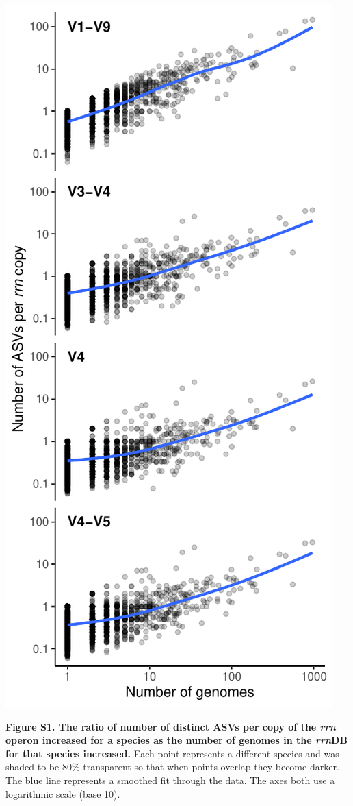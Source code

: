 \documentclass[
]{article}
\begin{document}
\newpage

\includegraphics{../figures/esv_rate.pdf}

\textbf{Figure S1. The ratio of number of distinct ASVs per copy of the
\emph{rrn} operon increased for a species as the number of genomes in
the \emph{rrn}DB for that species increased.} Each point represents a
different species and was shaded to be 80\% transparent so that when
points overlap they become darker. The blue line represents a smoothed
fit through the data. The axes both use a logarithmic scale (base 10).
\end{document}
